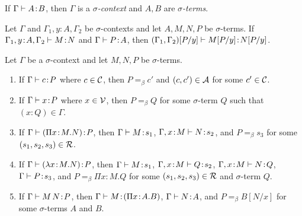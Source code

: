 \documentclass[reqno, twoside]{article}
\begin{document}
    \begin{definition}
        If $\Gamma\vdash A\!:\!B$, then $\Gamma$ is a \textit{$\sigma$-context} and $A,B$ are \textit{$\sigma$-terms}.
    \end{definition}

    \begin{lemma}\label{lem:substitution}
        Let $\Gamma$ and $\Gamma_1,y\!:\!A,\Gamma_2$ be $\sigma$-contexts and let $A,M,N,P$ be $\sigma$-terms. If $\Gamma_1,y\!:\!A,\Gamma_2\vdash M\!:\!N$ and $\Gamma\vdash P\!:\!A$, then $(\Gamma_1,\Gamma_2)[P/y]\vdash M[P/y]\!:\!N[P/y]$.
    \end{lemma}

    \begin{lemma}\label{lem:stripping}
        Let $\Gamma$ be a $\sigma$-context and let $M,N,P$ be $\sigma$-terms.
        \begin{enumerate}
            \item If $\Gamma\vdash c\!:\!P$ where $c\in\mathcal{C}$, then $P=_\beta c'$ and $(c,c')\in\mathcal{A}$ for some $c'\in\mathcal{C}$.
                \vspace{-0.05in}
            \item If $\Gamma\vdash x\!:\!P$ where $x\in\mathcal{V}$, then $P=_\beta Q$ for some $\sigma$-term $Q$ such that $(x\!:\!Q)\in\Gamma$.
                \vspace{-0.05in}
            \item If $\Gamma\vdash(\Pi x\!:\!M.N)\!:\!P$, then $\Gamma\vdash M\!:\!s_1$, $\Gamma,x\!:\!M\vdash N\!:\!s_2$, and $P=_\beta s_3$ for some $(s_1,s_2,s_3)\in\mathcal{R}$.
                \vspace{-0.05in}
            \item If $\Gamma\vdash(\lambda x\!:\!M.N)\!:\!P$, then $\Gamma\vdash M\!:\!s_1$, $\Gamma,x\!:\!M\vdash Q\!:\!s_2$, $\Gamma,x\!:\!M\vdash N\!:\!Q$, $\Gamma\vdash P\!:\!s_3$, and $P=_\beta\Pi x\!:\! M.Q$ for some $(s_1,s_2,s_3)\in\mathcal{R}$ and $\sigma$-term $Q$.
                \vspace{-0.05in}
            \item If $\Gamma\vdash M\,N\!:\!P$, then $\Gamma\vdash M\!:\!(\Pi x\!:\!A.B)$, $\Gamma\vdash N\!:\!A$, and $P=_\beta B[N/x]$ for some $\sigma$-terms $A$ and $B$.
        \end{enumerate}
    \end{lemma}
\end{document}
